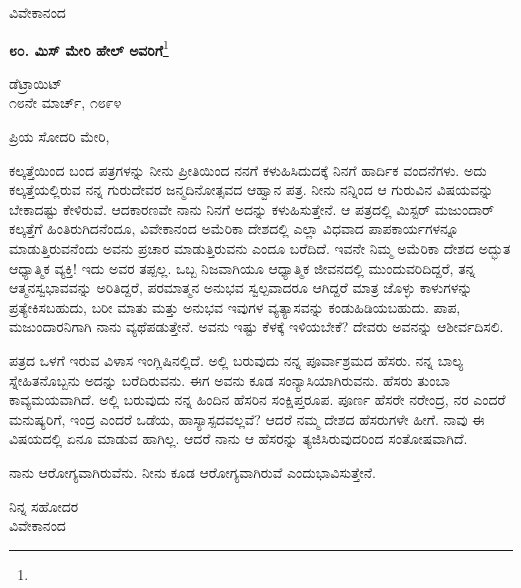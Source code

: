 \vspace{-0.5cm}

{\flushright
ವಿವೇಕಾನಂದ\par}

\begin{center}
\textbf{೮೦. ಮಿಸ್ ಮೇರಿ ಹೇಲ್‌ ಅವರಿಗೆ}\footnote{}
\end{center}

\vspace{-0.5cm}

\begin{flushright}
ಡೆಟ್ರಾಯಿಟ್\\೧೮ನೇ ಮಾರ್ಚ್, ೧೮೯೪
\end{flushright}

\vspace{-0.5cm}

\noindent
ಪ್ರಿಯ ಸೋದರಿ ಮೇರಿ,

ಕಲ್ಕತ್ತೆಯಿಂದ ಬಂದ ಪತ್ರಗಳನ್ನು ನೀನು ಪ್ರೀತಿಯಿಂದ ನನಗೆ ಕಳುಹಿಸಿದುದಕ್ಕೆ ನಿನಗೆ ಹಾರ್ದಿಕ ವಂದನೆಗಳು. ಅದು ಕಲ್ಕತ್ತೆಯಲ್ಲಿರುವ ನನ್ನ ಗುರುದೇವರ ಜನ್ಮದಿನೋತ್ಸವದ ಆಹ್ವಾನ ಪತ್ರ. ನೀನು ನನ್ನಿಂದ ಆ ಗುರುವಿನ ವಿಷಯವನ್ನು ಬೇಕಾದಷ್ಟು ಕೇಳಿರುವೆ. ಆದಕಾರಣವೇ ನಾನು ನಿನಗೆ ಅದನ್ನು ಕಳುಹಿಸುತ್ತೇನೆ. ಆ ಪತ್ರದಲ್ಲಿ ಮಿಸ್ಟರ್ ಮಜುಂದಾರ್ ಕಲ್ಕತ್ತೆಗೆ ಹಿಂತಿರುಗಿದನೆಂದೂ, ವಿವೇಕಾನಂದ ಅಮೆರಿಕಾ ದೇಶದಲ್ಲಿ ಎಲ್ಲಾ ವಿಧವಾದ ಪಾಪಕಾರ್ಯಗಳನ್ನೂ ಮಾಡುತ್ತಿರುವನೆಂದು ಅವನು ಪ್ರಚಾರ ಮಾಡುತ್ತಿರುವನು ಎಂದೂ ಬರೆದಿದೆ. ಇವನೇ ನಿಮ್ಮ ಅಮೆರಿಕಾ ದೇಶದ ಅದ್ಭುತ ಆಧ್ಯಾತ್ಮಿಕ ವ್ಯಕ್ತಿ! ಇದು ಅವರ ತಪ್ಪಲ್ಲ. ಒಬ್ಬ ನಿಜವಾಗಿಯೂ ಆಧ್ಯಾತ್ಮಿಕ ಜೀವನದಲ್ಲಿ ಮುಂದುವರಿದಿದ್ದರೆ, ತನ್ನ ಆತ್ಮನಸ್ವಭಾವವನ್ನು ಅರಿತಿದ್ದರೆ, ಪರಮಾತ್ಮನ ಅನುಭವ ಸ್ವಲ್ಪವಾದರೂ ಆಗಿದ್ದರೆ ಮಾತ್ರ ಜೊಳ್ಳು ಕಾಳುಗಳನ್ನು ಪ್ರತ್ಯೇಕಿಸಬಹುದು, ಬರೀ ಮಾತು ಮತ್ತು ಅನುಭವ ಇವುಗಳ ವ್ಯತ್ಯಾಸವನ್ನು ಕಂಡುಹಿಡಿಯಬಹುದು. ಪಾಪ, ಮಜುಂದಾರನಿಗಾಗಿ ನಾನು ವ್ಯಥೆಪಡುತ್ತೇನೆ. ಅವನು ಇಷ್ಟು ಕೆಳಕ್ಕೆ ಇಳಿಯಬೇಕೆ? ದೇವರು ಅವನನ್ನು ಆಶೀರ್ವದಿಸಲಿ.

ಪತ್ರದ ಒಳಗೆ ಇರುವ ವಿಳಾಸ ಇಂಗ್ಲಿಷಿನಲ್ಲಿದೆ. ಅಲ್ಲಿ ಬರುವುದು ನನ್ನ ಪೂರ್ವಾ\break ಶ್ರಮದ ಹೆಸರು. ನನ್ನ ಬಾಲ್ಯ ಸ್ನೇಹಿತನೊಬ್ಬನು ಅದನ್ನು ಬರೆದಿರುವನು. ಈಗ ಅವನು ಕೂಡ ಸಂನ್ಯಾಸಿಯಾಗಿರುವನು. ಹೆಸರು ತುಂಬಾ ಕಾವ್ಯಮಯವಾಗಿದೆ. ಅಲ್ಲಿ ಬರುವುದು ನನ್ನ ಹಿಂದಿನ ಹೆಸರಿನ ಸಂಕ್ಷಿಪ್ತರೂಪ. ಪೂರ್ಣ ಹೆಸರೇ ನರೇಂದ್ರ, ನರ ಎಂದರೆ ಮನುಷ್ಯರಿಗೆ, ಇಂದ್ರ ಎಂದರೆ ಒಡೆಯ, ಹಾಸ್ಯಾಸ್ಪದವಲ್ಲವೆ? ಆದರೆ ನಮ್ಮ ದೇಶದ ಹೆಸರುಗಳೇ ಹೀಗೆ. ನಾವು ಈ ವಿಷಯದಲ್ಲಿ ಏನೂ ಮಾಡುವ ಹಾಗಿಲ್ಲ. ಆದರೆ ನಾನು ಆ ಹೆಸರನ್ನು ತ್ಯಜಿಸಿರುವುದರಿಂದ ಸಂತೋಷವಾಗಿದೆ.

ನಾನು ಆರೋಗ್ಯವಾಗಿರುವೆನು. ನೀನು ಕೂಡ ಆರೋಗ್ಯವಾಗಿರುವೆ ಎಂದು\break ಭಾವಿಸುತ್ತೇನೆ.
\vspace{-0.6cm}

{\flushright
ನಿನ್ನ ಸಹೋದರ\\ವಿವೇಕಾನಂದ\par}
\vspace{-0.4cm}


